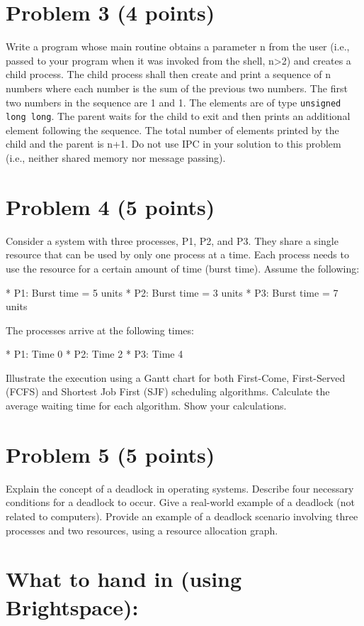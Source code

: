 \documentclass{article}
\begin{document}
\section*{Problem 3 (4 points)}

Write a program whose main routine obtains a parameter n from the user (i.e., passed to your program when it was invoked from the shell, n>2) and creates a child process. The child process shall then create and print a sequence of n numbers where each number is the sum of the previous two numbers.  The first two numbers in the sequence are 1 and 1. The elements are of type \texttt{unsigned long long}.  The parent waits for the child to exit and then prints an additional element following the sequence. The total number of elements printed by the child and the parent is n+1. Do not use IPC in your solution to this problem (i.e., neither shared memory nor message passing).


\section*{Problem 4 (5 points)}

Consider a system with three processes, P1, P2, and P3.  They share a single resource that can be used by only one process at a time.  Each process needs to use the resource for a certain amount of time (burst time).  Assume the following:

* P1: Burst time = 5 units
* P2: Burst time = 3 units
* P3: Burst time = 7 units

The processes arrive at the following times:

* P1: Time 0
* P2: Time 2
* P3: Time 4

Illustrate the execution using a Gantt chart for both First-Come, First-Served (FCFS) and Shortest Job First (SJF) scheduling algorithms. Calculate the average waiting time for each algorithm.  Show your calculations.


\section*{Problem 5 (5 points)}

Explain the concept of a deadlock in operating systems. Describe four necessary conditions for a deadlock to occur.  Give a real-world example of a deadlock (not related to computers). Provide an example of a deadlock scenario involving three processes and two resources, using a resource allocation graph.


\section*{What to hand in (using Brightspace):}
\end{document}
